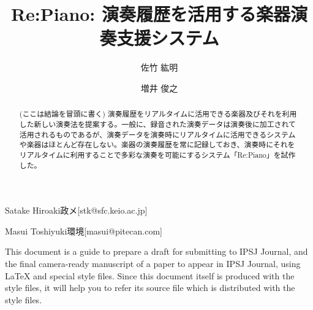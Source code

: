 \documentclass[submit,techreq]{ec2017}
\begin{document}
\title{Re:Piano: 演奏履歴を活用する楽器演奏支援システム}



\author{佐竹 紘明}{Satake Hiroaki}{政メ}[stk@sfc.keio.ac.jp]
\author{増井 俊之}{Masui Toshiyuki}{環境}[masui@pitecan.com]

\begin{abstract}
(ここは結論を冒頭に書く)
演奏履歴をリアルタイムに活用できる楽器及びそれを利用した新しい演奏法を提案する。一般に、録音された演奏データは演奏後に加工されて活用されるものであるが、演奏データを演奏時にリアルタイムに活用できるシステムや楽器はほとんど存在しない。楽器の演奏履歴を常に記録しておき、演奏時にそれをリアルタイムに利用することで多彩な演奏を可能にするシステム「Re:Piano」を試作した。
\end{abstract}

%
\begin{eabstract}
This document is a guide to prepare a draft for submitting to IPSJ
Journal, and the final camera-ready manuscript of a paper to appear in
IPSJ Journal, using {\LaTeX} and special style files.  Since this
document itself is produced with the style files, it will help you to
refer its source file which is distributed with the style files.
\end{eabstract}


\maketitle










\end{document}
